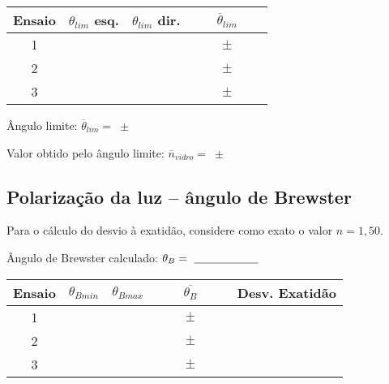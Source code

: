 \documentclass[a4paper,12pt]{article}  %
\begin{document}
\begin{center}
	\begin{tabular}{|c|c|c|c|}
	\hline
	 Ensaio   &  $\theta_{lim}$ esq.  & $\theta_{lim}$ dir.  &  $\overline{\theta}_{lim}$  \\
	\hline \hline
	 1 & & & $\qquad\pm\qquad$ \\\cline{1-4}
	 2 & & & $\qquad\pm\qquad$   \\\cline{1-4}
	 3 & & & $\qquad\pm\qquad$   \\
	  \hline
	\end{tabular}
\end{center}



Ângulo limite: $\overline{\theta}_{lim} =$~\underline{\makebox[2cm][r]{~}}$\pm$~\underline{\makebox[2cm][r]{~}}

Valor obtido pelo ângulo limite: $\overline{n}_{vidro} =$~\underline{\makebox[2cm][r]{~}}$\pm$~\underline{\makebox[2cm][r]{~}}




\subsection{\sf Polarização da luz -- ângulo de Brewster}\label{sec:dados_ar}

Para o cálculo do desvio à exatidão, considere como exato o valor $n=1,50$.

Ângulo de Brewster calculado: $\theta_B=~\underline{\makebox[2cm][r]{~}}$



\begin{center}
	\begin{tabular}{|c|c|c|c|c|}
	\hline \hline
	 Ensaio & $\theta_{Bmin} $ & $\theta_{Bmax} $ & $\overline{\theta_{B}} $  & Desv. Exatidão \\
	 \hline \hline
	 1 & & & $\qquad\pm\qquad$ & \\ \cline{1-5}
	 2 & & & $\qquad\pm\qquad$ & \\ \cline{1-5}
	 3 & & & $\qquad\pm\qquad$  & \\ \hline
			\end{tabular}
\end{center}

\end{document}
